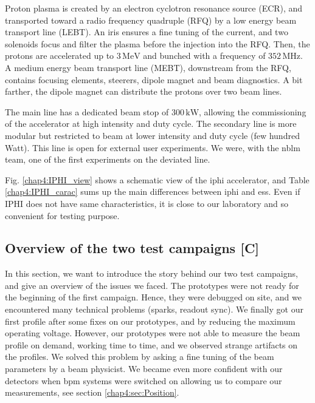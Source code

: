 \begin{refsection}
  Proton plasma is created by an electron cyclotron resonance source (ECR), and transported toward a radio frequency quadruple (RFQ) by a low energy beam transport line (LEBT).
  An iris ensures a fine tuning of the current, and two solenoids focus and filter the plasma before the injection into the RFQ.
  Then, the protons are accelerated up to $3\,\mathrm{MeV}$ and bunched with a frequency of $352\,\mathrm{MHz}$.
  A medium energy beam transport line (MEBT), downstream from the RFQ, contains focusing elements, steerers, dipole magnet and beam diagnostics.
  A bit farther, the dipole magnet can distribute the protons over two beam lines.

  

  The main line has a dedicated beam stop of $300\,\mathrm{kW}$, allowing the commissioning of the accelerator at high intensity and duty cycle.
  The secondary line is more modular but restricted to beam at lower intensity and duty cycle (few hundred Watt).
  This line is open for external user experiments.
  We were, with the \acrshort{nblm} team, one of the first experiments on the deviated line\cite{Senee:IPAC2018-TUPAF016}.

  Fig. \ref{chap4:IPHI_view} shows a schematic view of the \acrshort{iphi} accelerator, and Table \ref{chap4:IPHI_carac} sums up the main differences between \acrshort{iphi} and \acrshort{ess}. Even if IPHI does not have same characteristics, it is close to our laboratory and so convenient for testing purpose.

  

  \subsection{Overview of the two test campaigns [C]}
  In this section, we want to introduce the story behind our two test campaigns, and give an overview of the issues we faced.
  The prototypes were not ready for the beginning of the first campaign.
  Hence, they were debugged on site, and we encountered many technical problems (sparks, readout sync).
  We finally got our first profile after some fixes on our prototypes, and by reducing the maximum operating voltage.
  However, our prototypes were not able to measure the beam profile on demand, working time to time, and we observed strange artifacts on the profiles.
  We solved this problem by asking a fine tuning of the beam parameters by a beam physicist.
  We became even more confident with our detectors when \acrfull{bpm} systems were switched on allowing us to compare our measurements, see section \ref{chap4:sec:Position}.


\end{refsection}
